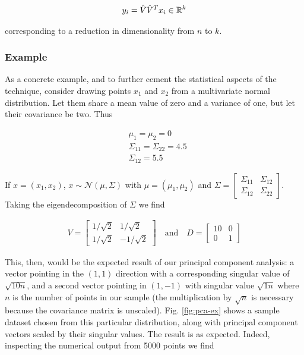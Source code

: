 \begin{align*}
  y_i = \hat{V}\hat{V}^T x_i \in \mathbb{R}^k
\end{align*}

corresponding to a reduction in dimensionality from $n$ to $k$.

\subsubsection{Example}

As a concrete example, and to further cement the statistical aspects
of the technique, consider drawing points $x_1$ and $x_2$ from a
multivariate normal distribution. Let them share a mean value of zero
and a variance of one, but let their covariance be two. Thus

\begin{align*}
  &\mu_1 = \mu_2 = 0 \\
  &\Sigma_{11} = \Sigma_{22} = 4.5 \\
  &\Sigma_{12} = 5.5
\end{align*}

If $x = (x_1, x_2)$, $x \sim \mathcal{N}(\mu, \Sigma)$ with
$\mu = (\mu_1, \mu_2)$ and $\Sigma = \begin{bmatrix} \Sigma_{11} &
  \Sigma_{12} \\ \Sigma_{12} &
  \Sigma_{22} \end{bmatrix}$. Taking the eigendecomposition of
$\Sigma$ we find

\begin{align*}
  V = \begin{bmatrix} 1/\sqrt{2} & 1/\sqrt{2} \\
    1/\sqrt{2} & - 1/\sqrt{2} 
  \end{bmatrix} \quad \mathrm{and} \quad
                 D = \begin{bmatrix} 10 & 0 \\
                   0 & 1 
                 \end{bmatrix}
\end{align*}

This, then, would be the expected result of our principal component
analysis: a vector pointing in the $(1,1)$ direction with a
corresponding singular value of $\sqrt{10 n}$, and a second vector
pointing in $(1, -1)$ with singular value $\sqrt{1 n}$ where $n$ is
the number of points in our sample (the multiplication by $\sqrt{n}$ is
necessary because the covariance matrix is
unscaled). Fig. \ref{fig:pca-ex} shows a sample dataset chosen from
this particular distribution, along with principal component vectors
scaled by their singular values. The result is as expected. Indeed,
inspecting the numerical output from 5000 points we find

